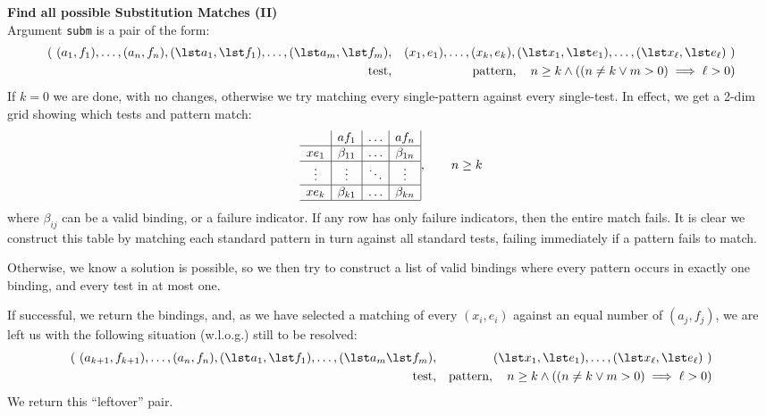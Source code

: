 \textbf{Find all possible Substitution Matches (II)}\\
  Argument \texttt{subm} is a pair of the form:
  \begin{eqnarray*}
   (~(a_1,f_1),\ldots,(a_n,f_n), (\lst a_1,\lst f_1),\ldots,(\lst a_m,\lst f_m)
   &,&
     (x_1,e_1),\ldots,(x_k,e_k), (\lst x_1,\lst e_1),\ldots,(\lst x_\ell,\lst e_\ell)~)
  \\ \mbox{test}  &,& \mbox{pattern}, \quad n \geq k \land ((n \neq k \lor m > 0) \implies \ell > 0)
  \end{eqnarray*}
If $k=0$ we are done, with no changes,
otherwise we try matching every single-pattern against every single-test.
In effect, we get a 2-dim grid showing which
tests and pattern match:
$$
\begin{array}{c|c|c|c|}
    & af_1 & \ldots & af_n
\\\hline
 xe_1 &  \beta_{11}  & \ldots   & \beta_{1n}
\\\hline
 \vdots & \vdots   & \ddots   & \vdots
\\\hline
 xe_k &  \beta_{k1}  &  \ldots  & \beta_{kn}
\\\hline
\end{array}
,\qquad n \geq k
$$
where $\beta_{ij}$ can be a valid binding, or a failure indicator.
If any row has only failure indicators,
then the entire match fails.
It is clear we construct this table by matching each standard
pattern in turn against all standard tests, failing immediately
if a pattern fails to match.

Otherwise, we know a solution is possible,
so we then try to construct a list of valid bindings where every pattern
occurs in exactly one binding, and every test in at most one.

If successful, we return the bindings,
and, as we have selected a matching of every $(x_i,e_i)$
  against an equal number of $(a_j,f_j)$,
  we are left us with the
  following situation (w.l.o.g.) still to be resolved:
  \begin{eqnarray*}
   (~(a_{k+1},f_{k+1}),\ldots,(a_n,f_n), (\lst a_1,\lst f_1),\ldots,(\lst a_m\lst f_m)
   &,&
     (\lst x_1,\lst e_1),\ldots,(\lst x_\ell,\lst e_\ell)~)
  \\ \mbox{test}  &,& \mbox{pattern}, \quad n \geq k \land ((n \neq k \lor m > 0) \implies \ell > 0)
  \end{eqnarray*}
  We return this ``leftover'' pair.

